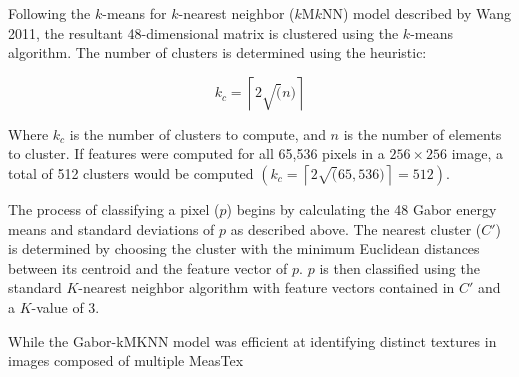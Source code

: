 Following the $k$-means for $k$-nearest neighbor
($k$M$k$NN) model described by Wang 2011, the resultant 48-dimensional
matrix is clustered using the $k$-means algorithm. The number of
clusters is determined using the heuristic:

$$
k_c = \left \lceil{2\sqrt(n)}\right \rceil
$$

Where $k_c$ is the number of clusters to compute, and $n$
is the number of elements to cluster. If features were computed for all 65,536
pixels in a $256\times256$ image, a total of 512 clusters would be computed
$\left(k_c = \left \lceil{2\sqrt(65,536)}\right \rceil = 512\right)$.

The process of classifying a pixel ($p$) begins by calculating the 48 Gabor
energy means and standard deviations of $p$ as described above. The nearest
cluster ($C'$) is determined by choosing the cluster with the minimum Euclidean
distances between its centroid and the feature vector of $p$. $p$ is then
classified using the standard $K$-nearest neighbor algorithm with
feature vectors contained in $C'$ and a $K$-value of 3.

While the Gabor-kMKNN model was efficient at identifying distinct textures in
images composed of multiple MeasTex